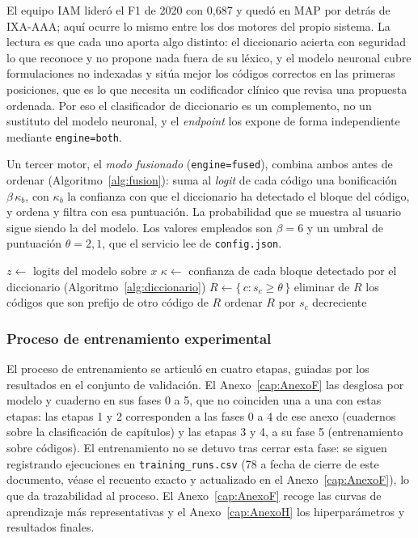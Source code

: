 El equipo IAM lideró el F1 de 2020 con 0,687 y quedó en MAP por detrás de IXA-AAA; aquí ocurre lo mismo entre los dos motores del propio sistema. La lectura es que cada uno aporta algo distinto: el diccionario acierta con seguridad lo que reconoce y no propone nada fuera de su léxico, y el modelo neuronal cubre formulaciones no indexadas y sitúa mejor los códigos correctos en las primeras posiciones, que es lo que necesita un codificador clínico que revisa una propuesta ordenada. Por eso el clasificador de diccionario es un complemento, no un sustituto del modelo neuronal, y el \emph{endpoint} los expone de forma independiente mediante \mbox{\texttt{engine=\textquotedbl{}both\textquotedbl{}}}.

Un tercer motor, el \emph{modo fusionado} (\texttt{engine=\textquotedbl{}fused\textquotedbl{}}), combina ambos antes de ordenar (Algoritmo~\ref{alg:fusion}): suma al \emph{logit} de cada código una bonificación $\beta\,\kappa_b$, con $\kappa_b$ la confianza con que el diccionario ha detectado el bloque del código, y ordena y filtra con esa puntuación. La probabilidad que se muestra al usuario sigue siendo la del modelo. Los valores empleados son $\beta=6$ y un umbral de puntuación $\theta=2{,}1$, que el servicio lee de \texttt{config.json}.

\begin{algorithm}[ht]
\DontPrintSemicolon
\caption{Ordenación en el modo fusionado.}
\label{alg:fusion}
$z \leftarrow$ logits del modelo sobre $x$\;
$\kappa \leftarrow$ confianza de cada bloque detectado por el diccionario (Algoritmo~\ref{alg:diccionario})\;
$R \leftarrow \{\, c : s_c \geq \theta \,\}$\;
eliminar de $R$ los códigos que son prefijo de otro código de $R$\;
ordenar $R$ por $s_c$ decreciente\;
\;
\end{algorithm}

\subsubsection{Proceso de entrenamiento experimental}
\label{sec:entrenamiento}

El proceso de entrenamiento se articuló en cuatro etapas, guiadas por los resultados en el conjunto de validación. El Anexo~\ref{cap:AnexoF} las desglosa por modelo y cuaderno en sus fases 0 a 5, que no coinciden una a una con estas etapas: las etapas 1 y 2 corresponden a las fases 0 a 4 de ese anexo (cuadernos sobre la clasificación de capítulos) y las etapas 3 y 4, a su fase 5 (entrenamiento sobre códigos). El entrenamiento no se detuvo tras cerrar esta fase: se siguen registrando ejecuciones en \texttt{training\_runs.csv} (78 a fecha de cierre de este documento, véase el recuento exacto y actualizado en el Anexo~\ref{cap:AnexoF}), lo que da trazabilidad al proceso. El Anexo~\ref{cap:AnexoF} recoge las curvas de aprendizaje más representativas y el Anexo~\ref{cap:AnexoH} los hiperparámetros y resultados finales.

